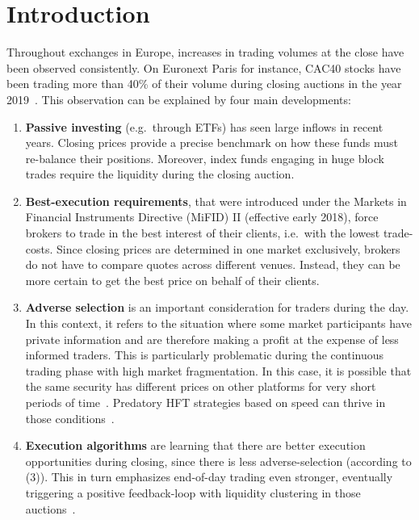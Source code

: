 \documentclass[11pt,a4paper]{article}
\begin{document}
%
    \clearpage


    \section{Introduction} \label{sec:introduction}

    Throughout exchanges in Europe, increases in trading volumes at the close have been observed consistently. On Euronext Paris for instance, CAC40 stocks have been trading more than 40\% of their volume during closing auctions in the year 2019~\parencite{Raillon2020}. This observation can be explained by four main developments:

    \begin{enumerate}[(1)]
        \item \textbf{Passive investing} (e.g.\ through ETFs) has seen large inflows in recent years. Closing prices provide a precise benchmark on how these funds must re-balance their positions. Moreover, index funds engaging in huge block trades require the liquidity during the closing auction.
        \item \textbf{Best-execution requirements}, that were introduced under the Markets in Financial Instruments Directive (MiFID) II (effective early 2018), force brokers to trade in the best interest of their clients, i.e.\ with the lowest trade-costs. Since closing prices are determined in one market exclusively, brokers do not have to compare quotes across different venues. Instead, they can be more certain to get the best price on behalf of their clients.
        \item \textbf{Adverse selection} is an important consideration for traders during the day. In this context, it refers to the situation where some market participants have private information and are therefore making a profit at the expense of less informed traders. This is particularly problematic during the continuous trading phase with high market fragmentation. In this case, it is possible that the same security has different prices on other platforms for very short periods of time~\parencite{BudishCramtonShim2015}. Predatory \ac{HFT} strategies based on speed can thrive in those conditions~\parencite{BiaisFoucaultMoinas2015}.
        \item \textbf{Execution algorithms} are learning that there are better execution opportunities during closing, since there is less adverse-selection (according to (3)). This in turn emphasizes end-of-day trading even stronger, eventually triggering a positive feedback-loop with liquidity clustering in those auctions~\parencite{Pagano1989Volume}.
    \end{enumerate}
\end{document}

